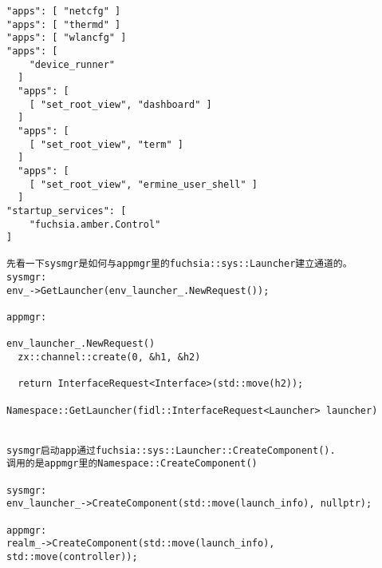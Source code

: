 \begin{verbatim}
"apps": [ "netcfg" ]
"apps": [ "thermd" ]
"apps": [ "wlancfg" ]
"apps": [
    "device_runner"
  ]
  "apps": [
    [ "set_root_view", "dashboard" ]
  ]
  "apps": [
    [ "set_root_view", "term" ]
  ]
  "apps": [
    [ "set_root_view", "ermine_user_shell" ]
  ]
"startup_services": [
    "fuchsia.amber.Control"
]

先看一下sysmgr是如何与appmgr里的fuchsia::sys::Launcher建立通道的。
sysmgr:
env_->GetLauncher(env_launcher_.NewRequest());

appmgr:

env_launcher_.NewRequest()
  zx::channel::create(0, &h1, &h2)

  return InterfaceRequest<Interface>(std::move(h2));

Namespace::GetLauncher(fidl::InterfaceRequest<Launcher> launcher)


sysmgr启动app通过fuchsia::sys::Launcher::CreateComponent().  
调用的是appmgr里的Namespace::CreateComponent()

sysmgr:
env_launcher_->CreateComponent(std::move(launch_info), nullptr);

appmgr:
realm_->CreateComponent(std::move(launch_info), std::move(controller));

\end{verbatim}
